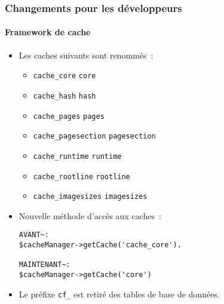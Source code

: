 
\begin{frame}[fragile]
	\frametitle{Changements pour les développeurs}
	\framesubtitle{Framework de cache}

	\lstset{basicstyle=\tiny\ttfamily}

	\begin{itemize}
		\item Les caches suivants sont renommés~:

			\begin{itemize}\smaller
				\item \texttt{cache\_core} \textrightarrow\hspace{0.1cm}\texttt{core}
				\item \texttt{cache\_hash} \textrightarrow\hspace{0.1cm}\texttt{hash}
				\item \texttt{cache\_pages} \textrightarrow\hspace{0.1cm}\texttt{pages}
				\item \texttt{cache\_pagesection} \textrightarrow\hspace{0.1cm}\texttt{pagesection}
				\item \texttt{cache\_runtime} \textrightarrow\hspace{0.1cm}\texttt{runtime}
				\item \texttt{cache\_rootline} \textrightarrow\hspace{0.1cm}\texttt{rootline}
				\item \texttt{cache\_imagesizes} \textrightarrow\hspace{0.1cm}\texttt{imagesizes}
			\end{itemize}\normalsize

		\item Nouvelle méthode d'accès aux caches~:

\begin{lstlisting}
AVANT~:
$cacheManager->getCache('cache_core').

MAINTENANT~:
$cacheManager->getCache('core')
\end{lstlisting}

		\item Le préfixe \texttt{cf\_} est retiré des tables de base de données.
	\end{itemize}

\end{frame}

